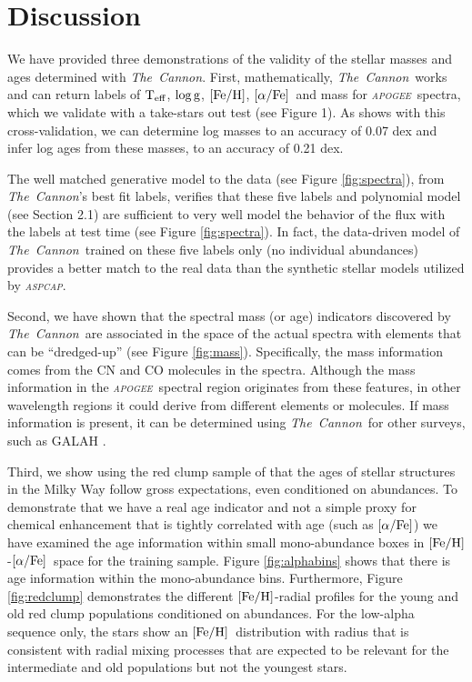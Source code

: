 \documentclass[12pt, preprint]{aastex}
\newcommand{\project}[1]{\textsl{#1}}
\newcommand{\tc}{\project{The~Cannon}}
\newcommand{\apogee}{\project{\textsc{apogee}}}
\newcommand{\aspcap}{\project{\textsc{aspcap}}}
\newcommand{\teff}{\mbox{$\rm T_{eff}$}}
\newcommand{\feh}{\mbox{$\rm [Fe/H]$}}
\newcommand{\alphafe}{\mbox{$\rm [\alpha/Fe]$}}
\newcommand{\logg}{\mbox{$\rm \log g$}}
\begin{document}
\section{Discussion}

We have provided three demonstrations of the validity of the stellar masses and ages  determined with \tc. First, mathematically, \tc\ works and can return labels of \teff, \logg, \feh, \alphafe\ and mass for \apogee\ spectra, which we validate with a take-stars out test (see Figure 1). As shows with this cross-validation, we can determine log masses to an accuracy of 0.07 dex and infer log ages from these masses, to an accuracy of 0.21 dex.  

The well matched generative model to the data (see Figure \ref{fig:spectra}), from \tc's best fit labels, verifies that these five labels and polynomial model (see Section 2.1) are sufficient to very well model the behavior of the flux with the labels at test time (see Figure \ref{fig:spectra}).  In fact, the data-driven model of \tc\ trained on these five labels only (no individual abundances) provides a better match to the real data than the synthetic stellar models utilized by \aspcap.




Second, we have shown that the spectral mass (or age) indicators discovered by \tc\ are associated in the space of the actual spectra with elements that can be ``dredged-up'' (see Figure \ref{fig:mass}). Specifically, the mass information comes from the CN and CO molecules in the spectra.  Although the mass information in the \apogee\ spectral region originates from these features, in other wavelength regions it could derive from different elements or molecules. If mass information is present, it can be determined using \tc\ for other surveys, such as GALAH \citep{Freeman2012}. 


Third, we show using the red clump sample of \citet{Bovy2014} that the ages of stellar structures in the Milky Way follow gross expectations, even conditioned on abundances. To demonstrate that we have a real age indicator and not a simple proxy for chemical enhancement that is tightly correlated with age (such as \alphafe) we have examined the age information within small mono-abundance boxes in \feh-\alphafe\ space for the training sample. Figure \ref{fig:alphabins} shows that there is age information within the mono-abundance bins. Furthermore, Figure \ref{fig:redclump} demonstrates the different \feh-radial profiles for the young and old red clump populations conditioned on abundances. For the low-alpha sequence only, the stars show an \feh\ distribution with radius that is consistent with radial mixing processes that are expected to be relevant for the intermediate and old populations but not the youngest stars.
\end{document}
